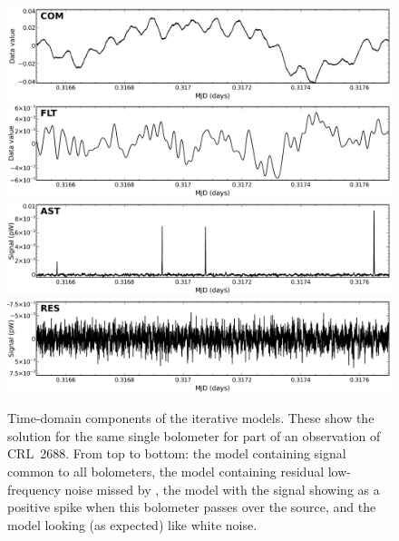 \begin{figure}
\begin{center}
  \includegraphics[width=\linewidth]{sc21_com} \\
  \includegraphics[width=\linewidth]{sc21_flt} \\
  \includegraphics[width=\linewidth]{sc21_ast} \\
  \includegraphics[width=\linewidth]{sc21_res} \\
\end{center}
\caption[Iterative models in the time domain]{\small Time-domain
components of the iterative models. These show the solution for the
same single bolometer for part of an observation of CRL~2688. From top
to bottom: the  model containing signal common to all
bolometers, the  model containing residual low-frequency
noise missed by , the  model with the signal
showing as a positive spike when this bolometer passes over the
source, and the  model looking (as expected) like white
noise.}
\label{fig:itercomp}
\end{figure}


